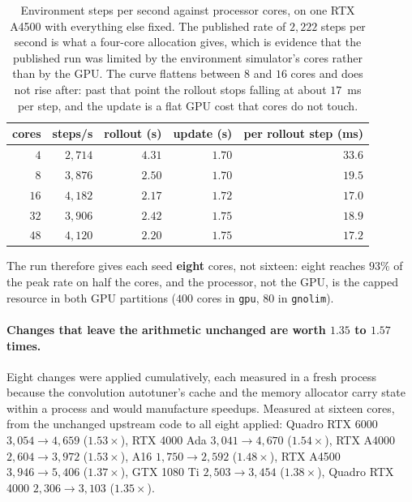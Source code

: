 \begin{table}[H]
\centering
\footnotesize
\setlength{\tabcolsep}{6pt}
\renewcommand{\arraystretch}{1.15}
\begin{tabular}{@{}rrrrr@{}}
\toprule
\textbf{cores} & \textbf{steps/s} & \textbf{rollout (s)} & \textbf{update (s)} & \textbf{per rollout step (ms)} \\
\midrule
$4$  & $2{,}714$ & $4.31$ & $1.70$ & $33.6$ \\
$8$  & $3{,}876$ & $2.50$ & $1.70$ & $19.5$ \\
$16$ & $4{,}182$ & $2.17$ & $1.72$ & $17.0$ \\
$32$ & $3{,}906$ & $2.42$ & $1.75$ & $18.9$ \\
$48$ & $4{,}120$ & $2.20$ & $1.75$ & $17.2$ \\
\bottomrule
\end{tabular}
\caption{Environment steps per second against processor cores, on one RTX A4500 with everything else
fixed. The published rate of $2{,}222$ steps per second is what a four-core allocation gives, which
is evidence that the published run was limited by the environment simulator's cores rather than by
the GPU. The curve flattens between $8$ and $16$ cores and does not rise after: past that point the
rollout stops falling at about $17$~ms per step, and the update is a flat GPU cost that cores do not
touch.}
\label{tab:cleanrl-cores}
\end{table}

The run therefore gives each seed \textbf{eight} cores, not sixteen: eight reaches $93\%$ of the peak
rate on half the cores, and the processor, not the GPU, is the capped resource in both GPU partitions
($400$ cores in \texttt{gpu}, $80$ in \texttt{gnolim}).

\paragraph{Changes that leave the arithmetic unchanged are worth $1.35$ to $1.57$ times.}
Eight changes were applied cumulatively, each measured in a fresh process because the convolution
autotuner's cache and the memory allocator carry state within a process and would manufacture
speedups. Measured at sixteen cores, from the unchanged upstream code to all eight applied: Quadro
RTX 6000 $3{,}054 \to 4{,}659$ ($1.53\times$), RTX 4000 Ada $3{,}041 \to 4{,}670$ ($1.54\times$), RTX
A4000 $2{,}604 \to 3{,}972$ ($1.53\times$), A16 $1{,}750 \to 2{,}592$ ($1.48\times$), RTX A4500
$3{,}946 \to 5{,}406$ ($1.37\times$), GTX 1080 Ti $2{,}503 \to 3{,}454$ ($1.38\times$), Quadro RTX
4000 $2{,}306 \to 3{,}103$ ($1.35\times$).

